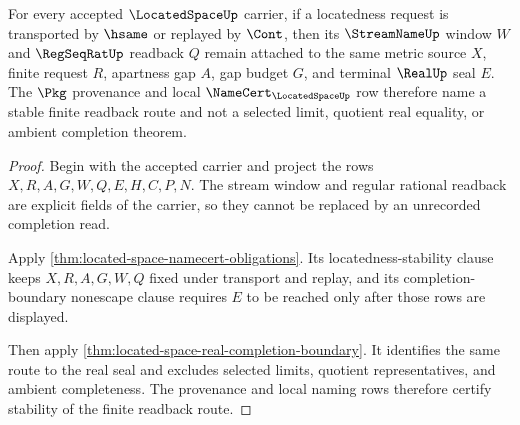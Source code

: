 \begin{theorem}
\label{thm:located-space-stream-readback-stability}
For every accepted $\LocatedSpaceUp$ carrier, if a locatedness request is transported by $\hsame$ or replayed by $\Cont$, then its $\StreamNameUp$ window $W$ and $\RegSeqRatUp$ readback $Q$ remain attached to the same metric source $X$, finite request $R$, apartness gap $A$, gap budget $G$, and terminal $\RealUp$ seal $E$. The $\Pkg$ provenance and local $\NameCert_{\LocatedSpaceUp}$ row therefore name a stable finite readback route and not a selected limit, quotient real equality, or ambient completion theorem.
\end{theorem}
\begin{proof}
Begin with the accepted carrier and project the rows $X,R,A,G,W,Q,E,H,C,P,N$. The stream window and regular rational readback are explicit fields of the carrier, so they cannot be replaced by an unrecorded completion read.

Apply \autoref{thm:located-space-namecert-obligations}. Its locatedness-stability clause keeps $X,R,A,G,W,Q$ fixed under transport and replay, and its completion-boundary nonescape clause requires $E$ to be reached only after those rows are displayed.

Then apply \autoref{thm:located-space-real-completion-boundary}. It identifies the same route to the real seal and excludes selected limits, quotient representatives, and ambient completeness. The provenance and local naming rows therefore certify stability of the finite readback route.
\end{proof}

